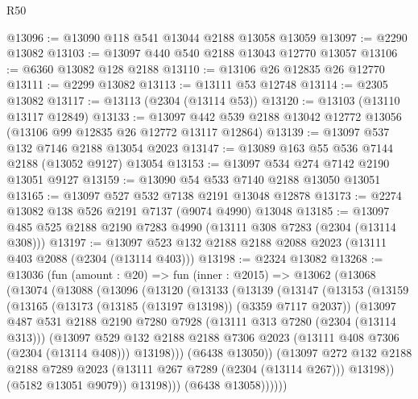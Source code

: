 \begin{lexlean}{R50}
\begin{coremodule}
@13096 := @13090 @118 @541 @13044 @2188 @13058 @13059
@13097 := @2290 @13082
@13103 := @13097 @440 @540 @2188 @13043 @12770 @13057
@13106 := @6360 @13082 @128 @2188
@13110 := @13106 @26 @12835 @26 @12770
@13111 := @2299 @13082
@13113 := @13111 @53 @12748
@13114 := @2305 @13082
@13117 := @13113 (@2304 (@13114 @53))
@13120 := @13103 (@13110 @13117 @12849)
@13133 := @13097 @442 @539 @2188 @13042 @12772 @13056 (@13106 @99 @12835 @26 @12772 @13117 @12864)
@13139 := @13097 @537 @132 @7146 @2188 @13054 @2023
@13147 := @13089 @163 @55 @536 @7144 @2188 (@13052 @9127) @13054
@13153 := @13097 @534 @274 @7142 @2190 @13051 @9127
@13159 := @13090 @54 @533 @7140 @2188 @13050 @13051
@13165 := @13097 @527 @532 @7138 @2191 @13048 @12878
@13173 := @2274 @13082 @138 @526 @2191 @7137 (@9074 @4990) @13048
@13185 := @13097 @485 @525 @2188 @2190 @7283 @4990 (@13111 @308 @7283 (@2304 (@13114 @308)))
@13197 := @13097 @523 @132 @2188 @2188 @2088 @2023 (@13111 @403 @2088 (@2304 (@13114 @403)))
@13198 := @2324 @13082
@13268 := @13036
    (fun (amount : @20) =>
    fun (inner : @2015) =>
    @13062
      (@13068
        (@13074
          (@13088
            (@13096
              (@13120
                (@13133
                  (@13139
                    (@13147
                      (@13153
                        (@13159
                          (@13165
                            (@13173 (@13185 (@13197 @13198)) (@3359 @7117 @2037))
                            (@13097
                              @487
                              @531
                              @2188
                              @2190
                              @7280
                              @7928
                              (@13111 @313 @7280 (@2304 (@13114 @313)))
                              (@13097
                                @529
                                @132
                                @2188
                                @2188
                                @7306
                                @2023
                                (@13111 @408 @7306 (@2304 (@13114 @408)))
                                @13198)))
                          (@6438 @13050))
                        (@13097
                          @272
                          @132
                          @2188
                          @2188
                          @7289
                          @2023
                          (@13111 @267 @7289 (@2304 (@13114 @267)))
                          @13198))
                      (@5182 @13051 @9079))
                    @13198)))
              (@6438 @13058))))))

\end{coremodule}
\end{lexlean}
